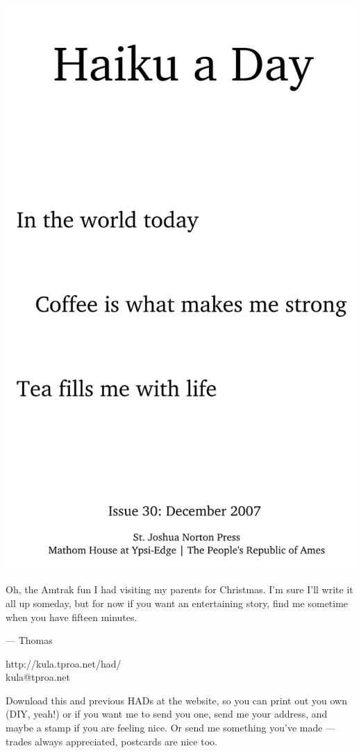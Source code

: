 \documentclass[12pt]{article}
\begin{document}
\includegraphics{frontpage.png}

\newpage

Oh, the Amtrak fun I had visiting my parents for Christmas.
I'm sure I'll write it all up someday, but for now if you want
an entertaining story, find me sometime when you have fifteen
minutes.

--- Thomas

http://kula.tproa.net/had/ \\
kula@tproa.net

Download this and previous HADs at the website, so you can
print out you own (DIY, yeah!) or if you want me to send
you one, send me your address, and maybe a stamp if you
are feeling nice. Or send me something you've made ---
trades always appreciated, postcards are nice too.
\end{document}
